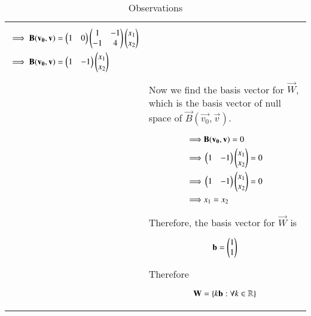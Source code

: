 \begin{longtable}{|l|l|}
{\begin{align}
    \implies\mathbf{B}(\mathbf{v_0},\mathbf{v})&=\begin{pmatrix}1&0\end{pmatrix}\begin{pmatrix}1&-1\\-1&4\end{pmatrix}\begin{pmatrix}x_1\\x_2\end{pmatrix}\\
    \implies\mathbf{B}(\mathbf{v_0},\mathbf{v})&=\begin{pmatrix}1&-1\end{pmatrix}\begin{pmatrix}x_1\\x_2\end{pmatrix}\label{eq:solutions/2018/dec/77/Bv0}
\end{align}}\\&Now we find the basis vector for $\vec{W}$, which is the basis vector of null space of $\vec{B}(\vec{v_0},\vec{v})$.\\&\parbox{15cm}{\begin{align}
    \implies&\mathbf{B}(\mathbf{v_0},\mathbf{v})=0\\
    \implies&\begin{pmatrix}1&-1\end{pmatrix}\begin{pmatrix}x_1\\x_2\end{pmatrix}=0\\
    \implies&\begin{pmatrix}1&-1\end{pmatrix}\begin{pmatrix}x_1\\x_2\end{pmatrix}=0\\
    \implies&x_1=x_2
\end{align}}\\&Therefore, the basis vector for $\vec{W}$ is\\&\parbox{15cm}{\begin{align}
    \mathbf{b}=\begin{pmatrix}1\\1\end{pmatrix}\label{eq:solutions/2018/dec/77/basis}
\end{align}}\\&Therefore\\&\parbox{15cm}{\begin{align}
    \mathbf{W}=\left\{k\mathbf{b}:\forall k\in\mathbb{R}\right\}\label{eq:solutions/2018/dec/77/Wkb}
\end{align}}\\
\hline
\caption{Observations}
\label{eq:solutions/2018/dec/77/obs}
\end{longtable}
